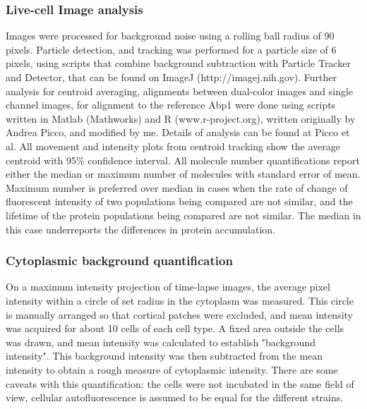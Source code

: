 \subsubsection{Live-cell Image analysis}
Images were processed for background noise using a rolling ball radius of 90 pixels. Particle detection, and tracking was performed for a particle size of 6 pixels, using scripts that combine background subtraction with Particle Tracker and Detector, that can be found on ImageJ (http://imagej.nih.gov). Further analysis for centroid averaging, alignments between dual-color images and single channel images, for alignment to the reference Abp1 were done using scripts written in Matlab (Mathworks) and R (www.r-project.org), written originally by Andrea Picco, and modified by me. Details of analysis can be found at Picco et al. All movement and intensity plots from centroid tracking show the average centroid with 95\% confidence interval. All molecule number quantifications report either the median or maximum number of molecules with standard error of mean. Maximum number is preferred over median in cases when the rate of change of fluorescent intensity of two populations being compared are not similar, and the lifetime of the protein populations being compared are not similar. The median in this case underreports the differences in protein accumulation. 

\subsubsection{Cytoplasmic background quantification}
On a maximum intensity projection of time-lapse images, the average pixel intensity within a circle of set radius in the cytoplasm was measured. This circle is manually arranged so that cortical patches were excluded, and mean intensity was acquired for about 10 cells of each cell type. A fixed area outside the cells was drawn, and mean intensity was calculated to establish "background intensity". This background intensity was then subtracted from the mean intensity to obtain a rough measure of cytoplasmic intensity.
There are some caveats with this quantification: the cells were not incubated in the same field of view, cellular autofluorescence is assumed to be equal for the different strains. 
